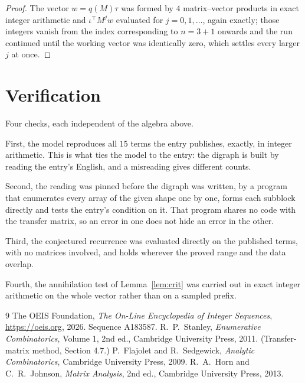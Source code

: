 \documentclass[11pt,a4paper]{article}
\theoremstyle{plain}
\theoremstyle{definition}
\begin{document}
\begin{proof}
The vector $w=q(M)\tau$ was formed by $4$ matrix--vector products in exact integer
arithmetic and $\iota^{\!\top}M^{j}w$ evaluated for $j=0,1,\dots$, again exactly; those
integers vanish from the index corresponding to $n=3+1$ onwards and the run continued
until the working vector was identically zero, which settles every larger $j$ at once.
\end{proof}

\section{Verification}

Four checks, each independent of the algebra above.

First, the model reproduces all $15$ terms the entry publishes, exactly, in integer
arithmetic. This is what ties the model to the entry: the digraph is built by reading the
entry's English, and a misreading gives different counts.

Second, the reading was pinned before the digraph was written, by a program that enumerates
every array of the given shape one by one, forms each subblock directly and tests the entry's
condition on it. That program shares no code with the transfer matrix, so an error in one does
not hide an error in the other.

Third, the conjectured recurrence was evaluated directly on the published terms, with no
matrices involved, and holds wherever the proved range and the data overlap.

Fourth, the annihilation test of Lemma~\ref{lem:crit} was carried out in exact integer
arithmetic on the whole vector rather than on a sampled prefix.

\begin{thebibliography}{9}
 The OEIS Foundation, \emph{The On-Line Encyclopedia of Integer
Sequences}, \url{https://oeis.org}, 2026. Sequence A183587.
 R.~P.~Stanley, \emph{Enumerative Combinatorics}, Volume 1, 2nd ed.,
Cambridge University Press, 2011. (Transfer-matrix method, Section 4.7.)
 P.~Flajolet and R.~Sedgewick, \emph{Analytic Combinatorics}, Cambridge
University Press, 2009.
 R.~A.~Horn and C.~R.~Johnson, \emph{Matrix Analysis}, 2nd ed., Cambridge
University Press, 2013.
\end{thebibliography}
\end{document}
